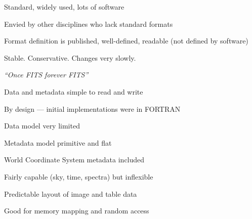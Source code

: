 \documentclass[20pt,landscape]{foils}
\begin{document}
\vspace*{-0.5cm}

\begin{list1}
  \item Standard, widely used, lots of software
\vspace*{-0.2cm}
  \begin{list2}
    \item Envied by other disciplines who lack standard formats
\vspace*{-0.1cm}
  \end{list2}
  \item Format definition is published, well-defined, readable
        (not defined by software)
  \item Stable.  Conservative.  Changes very slowly.
\vspace*{-0.2cm}
  \begin{list2}
    \item {\sl ``Once FITS forever FITS''}
\vspace*{-0.1cm}
  \end{list2}
  \item Data and metadata simple to read and write
\vspace*{-0.2cm}
  \begin{list2}
    \item By design --- initial implementations were in FORTRAN
\vspace*{-0.1cm}
    \item Data model very limited
\vspace*{-0.1cm}
    \item Metadata model primitive and flat
\vspace*{-0.1cm}
  \end{list2}
  \item World Coordinate System metadata included
\vspace*{-0.2cm}
  \begin{list2}
    \item Fairly capable (sky, time, spectra) but inflexible
\vspace*{-0.1cm}
  \end{list2}
  \item Predictable layout of image and table data
\vspace*{-0.2cm}
  \begin{list2}
    \item Good for memory mapping and random access
\vspace*{-0.1cm}
  \end{list2}

\end{list1}
\end{document}

